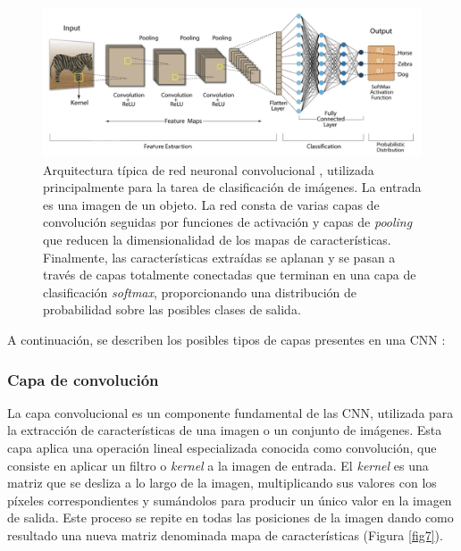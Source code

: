 \begin{figure}[h]
	\centering
	\includegraphics[scale=0.5]{imagenes/cap2/cnn.png}
	\caption[Arquitectura típica de red neuronal convolucional.]{Arquitectura típica de red neuronal convolucional \cite{41}, utilizada principalmente para la tarea de clasificación de imágenes. La entrada es una imagen de un objeto. La red consta de varias capas de convolución seguidas por funciones de activación y capas de \textit{pooling} que reducen la dimensionalidad de los mapas de características. Finalmente, las características extraídas se aplanan y se pasan a través de capas totalmente conectadas que terminan en una capa de clasificación \textit{softmax}, proporcionando una distribución de probabilidad sobre las posibles clases de salida.}
	\label{fig6}
\end{figure}

A continuación, se describen los posibles tipos de capas presentes en una CNN \cite{39,40}:


\subsubsection*{Capa de convolución}

La capa convolucional es un componente fundamental de las CNN, utilizada para la extracción de características de una imagen o un conjunto de imágenes. Esta capa aplica una operación lineal especializada conocida como convolución, que consiste en aplicar un filtro o \textit{kernel} a la imagen de entrada. El \textit{kernel} es una matriz que se desliza a lo largo de la imagen, multiplicando sus valores con los píxeles correspondientes y sumándolos para producir un único valor en la imagen de salida. Este proceso se repite en todas las posiciones de la imagen dando como resultado una nueva matriz denominada mapa de características (Figura \ref{fig7}).

